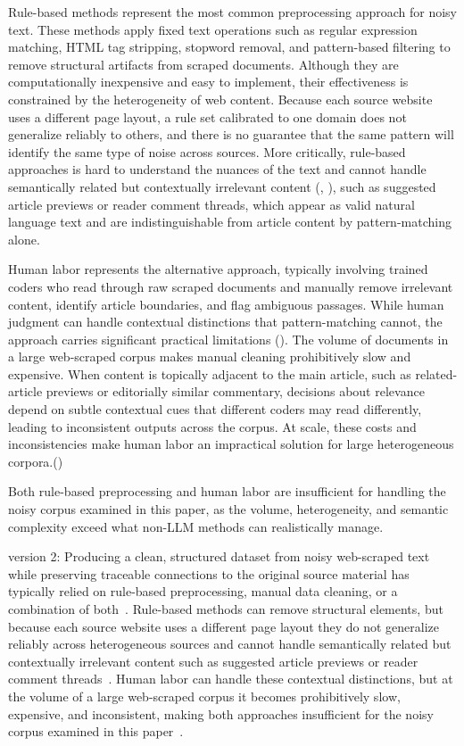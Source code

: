 \documentclass{article}
\begin{document}
Rule-based methods represent the most common preprocessing approach for noisy text. These methods apply fixed text operations such as regular expression matching, HTML tag stripping, stopword removal, and pattern-based filtering to remove structural artifacts from scraped documents. Although they are computationally inexpensive and easy to implement, their effectiveness is constrained by the heterogeneity of web content. Because each source website uses a different page layout, a rule set calibrated to one domain does not generalize reliably to others, and there is no guarantee that the same pattern will identify the same type of noise across sources. More critically, rule-based approaches is hard to understand the nuances of the text and cannot handle semantically related but contextually irrelevant content (\cite{Rahm2011}, \cite{Ma_etal2025}), such as suggested article previews or reader comment threads, which appear as valid natural language text and are indistinguishable from article content by pattern-matching alone. 

Human labor represents the alternative approach, typically involving trained coders who read through raw scraped documents and manually remove irrelevant content, identify article boundaries, and flag ambiguous passages. While human judgment can handle contextual distinctions that pattern-matching cannot, the approach carries significant practical limitations (\cite{Ma_etal2025}). The volume of documents in a large web-scraped corpus makes manual cleaning prohibitively slow and expensive. When content is topically adjacent to the main article, such as related-article previews or editorially similar commentary, decisions about relevance depend on subtle contextual cues that different coders may read differently, leading to inconsistent outputs across the corpus. At scale, these costs and inconsistencies make human labor an impractical solution for large heterogeneous corpora.(\cite{Ni_etal2024})

Both rule-based preprocessing and human labor are insufficient for handling the noisy corpus examined in this paper, as the volume, heterogeneity, and semantic complexity exceed what non-LLM methods can realistically manage.

version 2:
Producing a clean, structured dataset from noisy web-scraped text while preserving traceable connections to the original source material has typically relied on rule-based preprocessing, manual data cleaning, or a combination of both~\cite{Bohannon_etal2007,OpenRefine2025}. Rule-based methods can remove structural elements, but because each source website uses a different page layout they do not generalize reliably across heterogeneous sources and cannot handle semantically related but contextually irrelevant content such as suggested article previews or reader comment threads~\cite{Rahm2011,Ma_etal2025}. Human labor can handle these contextual distinctions, but at the volume of a large web-scraped corpus it becomes prohibitively slow, expensive, and inconsistent, making both approaches insufficient for the noisy corpus examined in this paper~\cite{Ma_etal2025,Ni_etal2024}.
\end{document}
